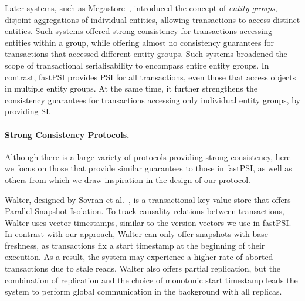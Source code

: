 Later systems, such as Megastore~\citep{baker_megastore}, introduced the concept of \emph{entity groups}, disjoint aggregations of individual entities, allowing transactions to access distinct entities. Such systems offered strong consistency for transactions accessing entities within a group, while offering almost no consistency guarantees for transactions that accessed different entity groups. Such systems broadened the scope of transactional serialisability to encompass entire entity groups. In contrast, fastPSI provides PSI for all transactions, even those that access objects in multiple entity groups. At the same time, it further strengthens the consistency guarantees for transactions accessing only individual entity groups, by providing SI.

\paragraph{Strong Consistency Protocols.} Although there is a large variety of protocols providing strong consistency, here we focus on those that provide similar guarantees to those in fastPSI, as well as others from which we draw inspiration in the design of our protocol.


Walter, designed by Sovran et al.~\citep{psi-intro}, is a transactional key-value store that offers Parallel Snapshot Isolation. To track causality relations between transactions, Walter uses vector timestamps, similar to the version vectors we use in fastPSI. In contrast with our approach, Walter can only offer snapshots with base freshness, as transactions fix a start timestamp at the beginning of their execution. As a result, the system may experience a higher rate of aborted transactions due to stale reads. Walter also offers partial replication, but the combination of replication and the choice of monotonic start timestamp leads the system to perform global communication in the background with all replicas.


